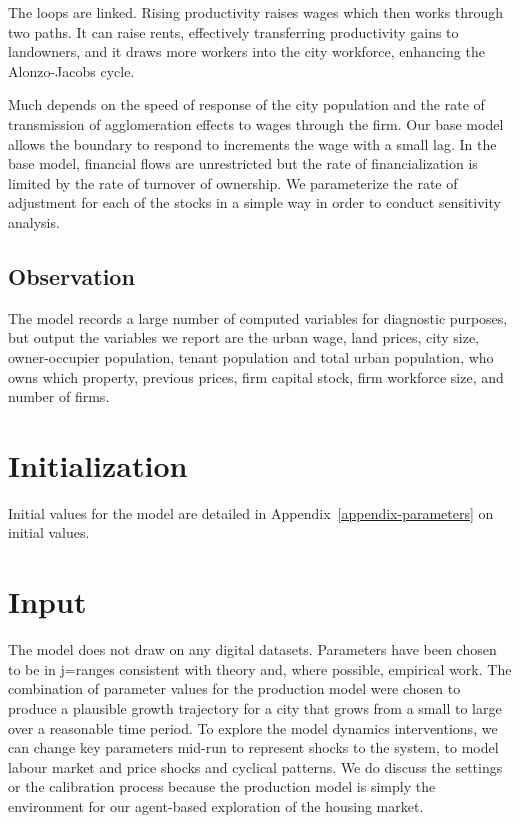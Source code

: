 The loops are linked. Rising productivity raises wages which then works through two paths. It can raise rents, effectively transferring productivity gains to landowners, and it draws more workers into the city workforce, enhancing the \Gls{Alonzo-Jacobs cycle}. 

Much depends on the speed of response of the city population and the rate of transmission of agglomeration effects to wages through the firm. Our base model allows the boundary to respond to increments the wage with a small lag. In the base model, financial flows are unrestricted but the rate of financialization is limited by the rate of turnover of ownership. We parameterize the rate of adjustment for each of the stocks in a simple way in order to conduct sensitivity analysis.

\subsection{Observation}
The model records a large number of computed variables for diagnostic purposes, but output the variables we report are  the urban wage, land prices, city size, owner-occupier population, tenant population and total urban population, who owns which property, previous prices, firm capital stock, firm workforce size, and number of firms.

\section{Initialization}
Initial values for the model are detailed in Appendix~\ref{appendix-parameters} on initial values.

\section{Input}
The model does not draw on any digital datasets. Parameters have been chosen to be in j=ranges consistent with  theory and, where possible, empirical work. The combination of parameter values for the production model were chosen to produce a plausible growth trajectory for a city that grows from a small to large over a reasonable time period. To explore the model dynamics interventions, we can change key parameters mid-run to represent shocks to the system, to model labour market and price shocks and cyclical patterns. We do discuss the settings or the calibration process because the production model is simply the environment for  our agent-based exploration of the housing market.  %

